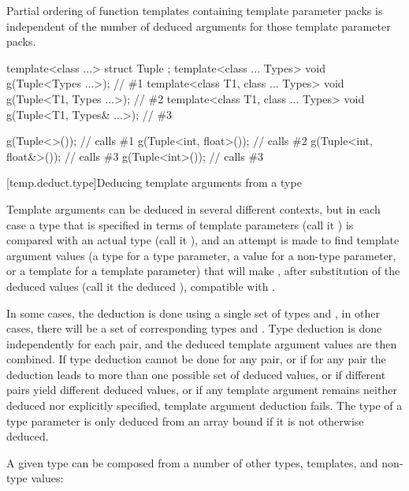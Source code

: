 \pnum
\begin{note} Partial ordering of function templates containing
template parameter packs is independent of the number of deduced arguments
for those template parameter packs. \end{note} \begin{example}

\begin{codeblock}
template<class ...> struct Tuple { };
template<class ... Types> void g(Tuple<Types ...>);                 // \#1
template<class T1, class ... Types> void g(Tuple<T1, Types ...>);   // \#2
template<class T1, class ... Types> void g(Tuple<T1, Types& ...>);  // \#3

g(Tuple<>());                   // calls \#1
g(Tuple<int, float>());         // calls \#2
g(Tuple<int, float&>());        // calls \#3
g(Tuple<int>());                // calls \#3
\end{codeblock}

\end{example}

[temp.deduct.type]{Deducing template arguments from a type}

\pnum
Template arguments can be deduced in several different contexts, but
in each case a type that is specified in terms of template parameters
(call it
)
is compared with an actual type (call it
),
and an attempt is made to find template argument values (a type for a type
parameter, a value for a non-type parameter, or a template for a
template parameter) that will make
,
after substitution of the deduced values (call it the deduced
),
compatible with
.

\pnum
In some cases, the deduction is done using a single set of types
and
,
in other cases, there will be a set of corresponding types
and
.
Type deduction is done
independently for each
pair, and the deduced template
argument values are then combined.
If type deduction cannot be done
for any
pair, or if for any pair the deduction leads to more than
one possible set of deduced values, or if different pairs yield
different deduced values, or if any template argument remains neither
deduced nor explicitly specified, template argument deduction fails.
The type of a type parameter
is only deduced from an array bound
if it is not otherwise deduced.

\pnum
A given type
can be composed from a number of other
types, templates, and non-type values:

